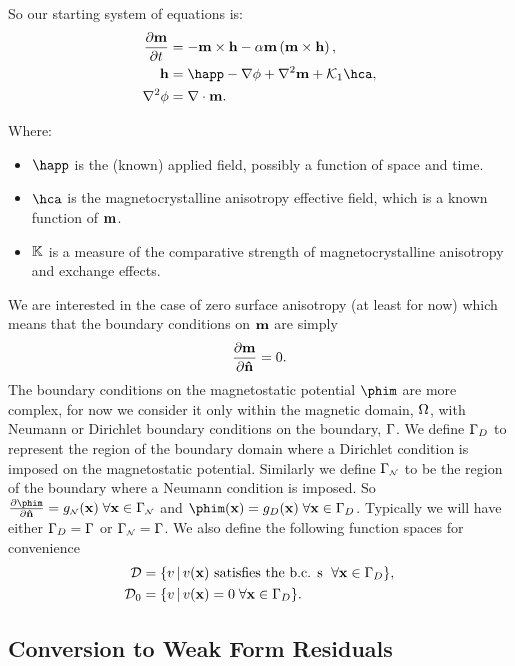 So our starting system of equations is:
\begin{align}
  \dmdt &= -\mxh -\dampc \mxmxh, \label{eq:ndll} \\
  \hv &= \happ - \nabla \phi + \nabla^2 \mv + \kone \hca, \label{eq:ndh} \\
  \nabla^2 \phi &= \nabla \cdot \mv. \label{eq:ndphi}
\end{align}

Where:
\begin{itemize}
\item $\happ$ is the (known) applied field, possibly a function of space and time.
\item $\hca$ is the magnetocrystalline anisotropy effective field, which is a known function of $\mathbf{m}$.
\item $\mathbb{K}$ is a measure of the comparative strength of magnetocrystalline anisotropy and exchange effects.
\end{itemize}

We are interested in the case of zero surface anisotropy (at least for now) which means that the boundary conditions on $\mathbf{m}$ are simply\cite{Aharoni1996} %
\begin{equation}
  \frac{\partial \mathbf{m}}{\partial \mathbf{\hat{n}}} = 0. \label{eqn:mbc}
\end{equation}
The boundary conditions on the magnetostatic potential $\phim$ are more complex, for now we consider it only within the magnetic domain, $\Omega$, with Neumann or Dirichlet boundary conditions on the boundary, ${\Gamma}$.
We define ${\Gamma}_D$ to represent the region of the boundary domain where a Dirichlet condition is imposed on the magnetostatic potential.
Similarly we define ${\Gamma}_{\scriptscriptstyle{\mathcal{N}}}$ to be the region of the boundary where a Neumann condition is imposed. So $ \ddn{\phim} = g_\Neu(\xv) \; \forall \xv \in \boundd_\Neu$ and $\phim(\xv) = g_D(\xv) \; \forall \xv \in \boundd_D$.
Typically we will have either ${\Gamma}_D = {\Gamma}$ or ${\Gamma}_{\scriptscriptstyle{\mathcal{N}}} = {\Gamma}$.
We also define the following function spaces for convenience
\begin{align}
  \label{eq:037}
  \mathcal{D} & = \{ v \,|\, v(\mathbf{x}) \text{ satisfies the b.c. s } \; \forall \mathbf{x} \in {\Gamma}_D \}, \\
  \mathcal{D}_0 &= \{ v \,|\, v(\mathbf{x}) = 0 \; \forall \mathbf{x} \in {\Gamma}_D \}.
\end{align}



\subsection{Conversion to Weak Form Residuals}

